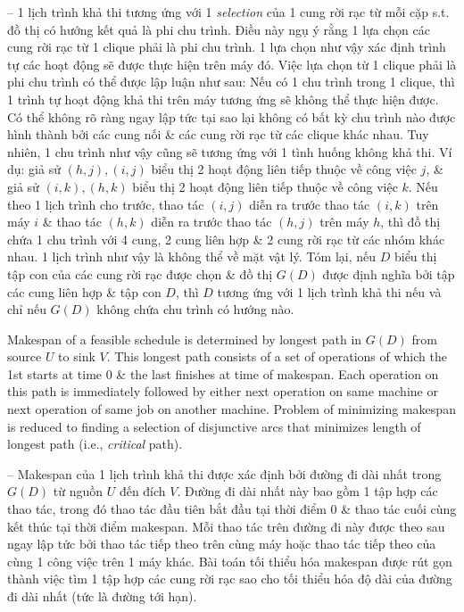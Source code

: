 \documentclass{article}
\begin{document}
\begin{itemize}
\begin{itemize}
        -- 1 lịch trình khả thi tương ứng với 1 {\it selection} của 1 cung rời rạc từ mỗi cặp s.t. đồ thị có hướng kết quả là phi chu trình. Điều này ngụ ý rằng 1 lựa chọn các cung rời rạc từ 1 clique phải là phi chu trình. 1 lựa chọn như vậy xác định trình tự các hoạt động sẽ được thực hiện trên máy đó. Việc lựa chọn từ 1 clique phải là phi chu trình có thể được lập luận như sau: Nếu có 1 chu trình trong 1 clique, thì 1 trình tự hoạt động khả thi trên máy tương ứng sẽ không thể thực hiện được. Có thể không rõ ràng ngay lập tức tại sao lại không có bất kỳ chu trình nào được hình thành bởi các cung nối \& các cung rời rạc từ các clique khác nhau. Tuy nhiên, 1 chu trình như vậy cũng sẽ tương ứng với 1 tình huống không khả thi. Ví dụ: giả sử $(h,j),(i,j)$ biểu thị 2 hoạt động liên tiếp thuộc về công việc $j$, \& giả sử $(i,k),(h,k)$ biểu thị 2 hoạt động liên tiếp thuộc về công việc $k$. Nếu theo 1 lịch trình cho trước, thao tác $(i,j)$ diễn ra trước thao tác $(i,k)$ trên máy $i$ \& thao tác $(h,k)$ diễn ra trước thao tác $(h,j)$ trên máy $h$, thì đồ thị chứa 1 chu trình với 4 cung, 2 cung liên hợp \& 2 cung rời rạc từ các nhóm khác nhau. 1 lịch trình như vậy là không thể về mặt vật lý. Tóm lại, nếu $D$ biểu thị tập con của các cung rời rạc được chọn \& đồ thị $G(D)$ được định nghĩa bởi tập các cung liên hợp \& tập con $D$, thì $D$ tương ứng với 1 lịch trình khả thi nếu và chỉ nếu $G(D)$ không chứa chu trình có hướng nào.

        Makespan of a feasible schedule is determined by longest path in $G(D)$ from source $U$ to sink $V$. This longest path consists of a set of operations of which the 1st starts at time 0 \& the last finishes at time of makespan. Each operation on this path is immediately followed by either next operation on same machine or next operation of same job on another machine. Problem of minimizing makespan is reduced to finding a selection of disjunctive arcs that minimizes length of longest path (i.e., {\it critical} path).

        -- Makespan của 1 lịch trình khả thi được xác định bởi đường đi dài nhất trong $G(D)$ từ nguồn $U$ đến đích $V$. Đường đi dài nhất này bao gồm 1 tập hợp các thao tác, trong đó thao tác đầu tiên bắt đầu tại thời điểm 0 \& thao tác cuối cùng kết thúc tại thời điểm makespan. Mỗi thao tác trên đường đi này được theo sau ngay lập tức bởi thao tác tiếp theo trên cùng máy hoặc thao tác tiếp theo của cùng 1 công việc trên 1 máy khác. Bài toán tối thiểu hóa makespan được rút gọn thành việc tìm 1 tập hợp các cung rời rạc sao cho tối thiểu hóa độ dài của đường đi dài nhất (tức là đường tới hạn).


\end{itemize}
\end{itemize}
\end{document}
